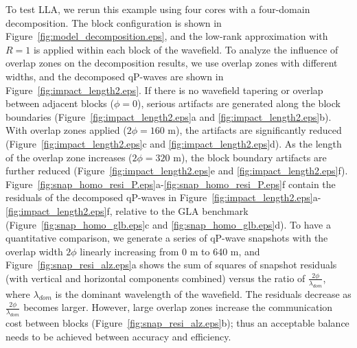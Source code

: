 \documentclass[manuscript,ulem,graphix,revised]{geophysics}
\begin{document}
To test LLA, we rerun this example using four cores with a four-domain decomposition. The block configuration is shown in Figure~\ref{fig:model_decomposition.eps}, and the low-rank approximation with $R=1$ is applied within each block of the wavefield. To analyze the influence of overlap zones on the decomposition results, we use overlap zones with different widths, and the decomposed qP-waves are shown in Figure~\ref{fig:impact_length2.eps}. If there is no wavefield tapering or overlap between adjacent blocks ($\phi=0$), serious artifacts are generated along the block boundaries (Figure~\ref{fig:impact_length2.eps}a and \ref{fig:impact_length2.eps}b). With overlap zones applied ($2\phi=160$ m), the artifacts are significantly reduced (Figure~\ref{fig:impact_length2.eps}c and \ref{fig:impact_length2.eps}d). As the length of the overlap zone increases ($2\phi=320$ m), the block boundary artifacts are further reduced (Figure~\ref{fig:impact_length2.eps}e and \ref{fig:impact_length2.eps}f). Figure~\ref{fig:snap_homo_resi_P.eps}a-\ref{fig:snap_homo_resi_P.eps}f contain the residuals of the decomposed qP-waves in Figure~\ref{fig:impact_length2.eps}a-\ref{fig:impact_length2.eps}f, relative to the GLA benchmark (Figure~\ref{fig:snap_homo_glb.eps}c and \ref{fig:snap_homo_glb.eps}d). 
To have a quantitative comparison, we generate a series of qP-wave snapshots with the overlap width $2\phi$ linearly increasing from 0 m to 640 m, and Figure~\ref{fig:snap_resi_alz.eps}a shows the sum of squares of snapshot residuals (with vertical and horizontal components combined) versus the ratio of $\frac{2\phi}{\lambda_{dom}}$, where $\lambda_{dom}$ is the dominant wavelength of the wavefield. The residuals decrease as $\frac{2\phi}{\lambda_{dom}}$ becomes larger.
However, large overlap zones increase the communication cost between blocks (Figure~\ref{fig:snap_resi_alz.eps}b); thus an acceptable balance needs to be achieved between accuracy and efficiency.


\end{document}
